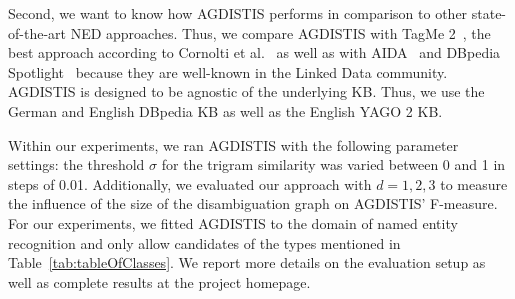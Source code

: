 
Second, we want to know how AGDISTIS performs in comparison to other state-of-the-art \ac{NED} approaches. 
Thus, we compare AGDISTIS with TagMe 2~\cite{TagMe2}, the best approach according to Cornolti et al.~\cite{cornolti} as well as with AIDA~\cite{AIDA} and DBpedia Spotlight~\cite{spotlight} because they are well-known in the Linked Data community. 
AGDISTIS is designed to be agnostic of the underlying \ac{KB}.
Thus, we use the German and English DBpedia \ac{KB} as well as the English YAGO 2 \ac{KB}. %

Within our experiments, we ran AGDISTIS with the following parameter settings: 
the threshold $\sigma$ for the trigram similarity was varied between 0 and 1 in steps of 0.01. 
Additionally, we evaluated our approach with $d=1,2,3$ to measure the influence of the size of the disambiguation graph on AGDISTIS' F-measure.
For our experiments, we fitted AGDISTIS to the domain of named entity recognition and only allow candidates of the types mentioned in Table~\ref{tab:tableOfClasses}.
We report more details on the evaluation setup as well as complete results at the project homepage.

